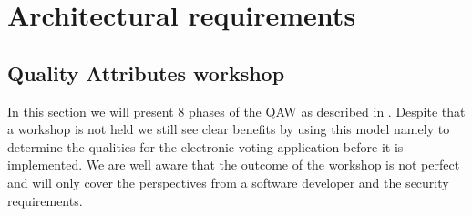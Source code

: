\section{Architectural requirements}






\subsection{Quality Attributes workshop}
In this section we will present 8 phases of the QAW as described in \cite{BarbacciQualityAttribute2003}. Despite that a workshop is not held we still see clear benefits by using this model namely to determine the qualities for the electronic voting application before it is implemented. We are well aware that the outcome of the workshop is not perfect and will only cover the perspectives from a software developer and the security requirements. 


